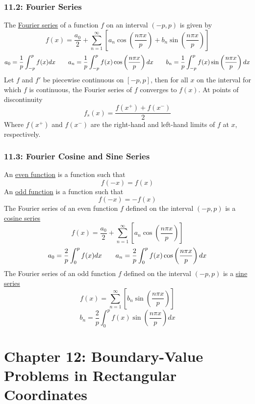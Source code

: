 \documentclass{article}
\begin{document}
\section*{11.2: Fourier Series}
The \underline{Fourier series} of a function \(f\) on an interval \((-p, p)\) is given by
\[f(x)=\frac{a_0}{2}+\sum_{n=1}^\infty\left[a_n\cos\left(\frac{n\pi x}{p}\right)+b_n\sin\left(\frac{n\pi x}{p}\right)\right]\]
\[a_0=\frac{1}{p}\int_{-p}^pf(x)dx\hspace{7 mm}a_n=\frac{1}{p}\int_{-p}^pf(x)\cos\left(\frac{n\pi x}{p}\right)dx\hspace{7 mm}b_n=\frac{1}{p}\int_{-p}^pf(x)\sin\left(\frac{n\pi x}{p}\right)dx\]
Let \(f\) and \(f'\) be piecewise continuous on \([-p, p]\), then for all \(x\) on the interval for which \(f\) is continuous, the Fourier series of \(f\) converges to \(f(x)\). At points of discontinuity
\[f_s(x)=\frac{f(x^+)+f(x^-)}{2}\]
Where \(f(x^+)\) and \(f(x^-)\) are the right-hand and left-hand limits of \(f\) at \(x\), respectively.
\section*{11.3: Fourier Cosine and Sine Series}
An \underline{even function} is a function such that
\[f(-x)=f(x)\]
An \underline{odd function} is a function such that
\[f(-x)=-f(x)\]
The Fourier series of an even function \(f\) defined on the interval \((-p, p)\) is a \underline{cosine series}
\[f(x)=\frac{a_0}{2}+\sum_{n=1}^\infty\left[a_n\cos\left(\frac{n\pi x}{p}\right)\right]\]
\[a_0=\frac{2}{p}\int_{0}^pf(x)dx\hspace{7 mm}a_n=\frac{2}{p}\int_{0}^pf(x)\cos\left(\frac{n\pi x}{p}\right)dx\]
The Fourier series of an odd function \(f\) defined on the interval \((-p, p)\) is a \underline{sine series}
\[f(x)=\sum_{n=1}^\infty\left[b_n\sin\left(\frac{n\pi x}{p}\right)\right]\]
\[b_n=\frac{2}{p}\int_{0}^pf(x)\sin\left(\frac{n\pi x}{p}\right)dx\]
\part*{Chapter 12: Boundary-Value Problems in Rectangular Coordinates}
\end{document}
